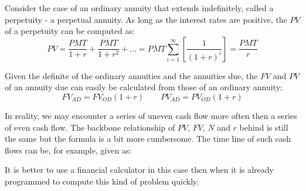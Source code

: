 Consider the case of an ordinary annuity that extends indefinitely, called a perpetuity - a perpetual annuity. As long as the interest rates are positive, the $PV$ of a perpetuity can be computed as:
\begin{equation}
	PV = \frac{PMT}{1+r} + \frac{PMT}{1+r^2} + ... = PMT \sum_{i=1}^{\infty} \left[ \frac{1}{(1+r)^i} \right] = \frac{PMT}{r}
\end{equation}

Given the definite of the ordinary annuities and the annuities due, the $FV$ and $PV$ of an annuity due can easily be calculated from those of an ordinary annuity:
\begin{equation}
	FV_{AD} = FV_{OD} (1+r) \quad\quad PV_{AD} = PV_{OD} (1+r)
\end{equation}

In reality, we may encounter a series of uneven cash flow more often then a series of even cash flow. The backbone relationship of $PV$, $FV$, $N$ and $r$ behind is still the same but the formula is a bit more cumbersome. The time line of such cash flows can be, for example, given as:
\newcommand{\timf}{{"0","1","2","3","4","5"}}
\newcommand{\tvmf}{{"","+1000","+2000","+3000","+4000","+5000"}}
\begin{center}
\end{center}
It is better to use a financial calculator in this case then when it is already programmed to compute this kind of problem quickly. 


